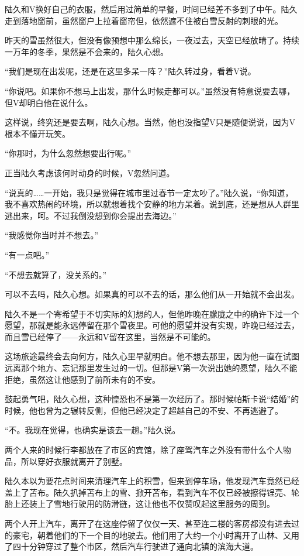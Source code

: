 陆久和V换好自己的衣服，然后用过简单的早餐，时间已经差不多到了中午。陆久走到落地窗前，虽然窗户上拉着窗帘但，依然遮不住被白雪反射的刺眼的光。

昨天的雪虽然很大，但没有像预想中那么绵长，一夜过去，天空已经放晴了。持续一万年的冬季，果然是不会来的，陆久心想。

“我们是现在出发呢，还是在这里多呆一阵？”陆久转过身，看着V说。

“你说吧。如果你不想马上出发，那什么时候走都可以。”虽然没有特意说要去哪，但V却明白他在说什么。

这样说，终究还是要去啊，陆久心想。当然，他也没指望V只是随便说说，因为V根本不懂开玩笑。

“你那时，为什么忽然想要出行呢。”

正当陆久考虑该何时动身的时候，V忽然问道。

“说真的……一开始，我只是觉得在城市里过春节一定太吵了。”陆久说，“你知道，我不喜欢热闹的环境，所以就想着找个安静的地方呆着。说到底，还是想从人群里逃出来，呵。不过我倒没想到你会提出去海边。”

“我感觉你当时并不想去。”

“有一点吧。”

“不想去就算了，没关系的。”

可以不去吗，陆久心想。如果真的可以不去的话，那么他们从一开始就不会出发。

陆久不是一个寄希望于不切实际的幻想的人，但他昨晚在朦胧之中的确许下过一个愿望，那就是能永远停留在那个雪夜里。可他的愿望并没有实现，昨晚已经过去，而且雪已经停了——永远和V留在这里，当然是不可能的。

这场旅途最终会去向何方，陆久心里早就明白。他不想去那里，因为他一直在试图远离那个地方、忘记那里发生过的一切。但那是V第一次说出她的愿望，陆久不能拒绝，虽然这让他感到了前所未有的不安。

鼓起勇气吧，陆久心想，这种惶恐也不是第一次经历了。那时候帕斯卡说“结婚”的时候，他也曾为之辗转反侧，但他已经决定了超越自己的不安、不再逃避了。

“不。我现在觉得，也确实是该去一趟。”陆久说。

两个人来的时候行李都放在了市区的宾馆，除了座驾汽车之外没有带什么个人物品，所以穿好衣服就离开了别墅。

陆久本以为要花点时间来清理汽车上的积雪，但来到停车场，他发现汽车竟然已经盖上了苫布。陆久扒掉苫布上的雪、掀开苫布，看到汽车不仅已经被擦得锃亮、轮胎上还装上了雪地行驶用的防滑链，这让他也不仅赞叹起这里服务的周到。

两个人开上汽车，离开了在这座停留了仅仅一天、甚至连二楼的客房都没有进去过的豪宅，朝着他们的下一个目的地驶去。他们用了大约一个小时离开了山林、又用了四十分钟穿过了整个市区，然后汽车行驶进了通向北镇的滨海大道。

